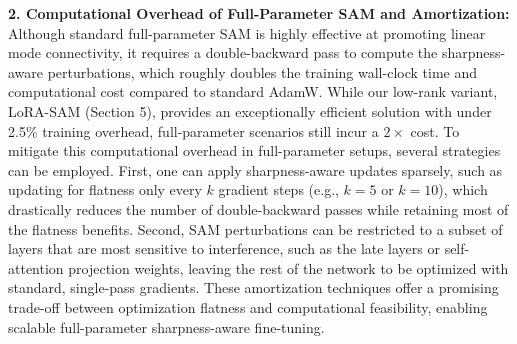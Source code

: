 \textbf{2. Computational Overhead of Full-Parameter SAM and Amortization:}
Although standard full-parameter SAM is highly effective at promoting linear mode connectivity,
it requires a double-backward pass to compute the sharpness-aware perturbations, which roughly
doubles the training wall-clock time and computational cost compared to standard AdamW. While our
low-rank variant, LoRA-SAM (Section 5), provides an exceptionally efficient solution with under
2.5\% training overhead, full-parameter scenarios still incur a $2\times$ cost. To mitigate this
computational overhead in full-parameter setups, several strategies can be employed. First, one
can apply sharpness-aware updates sparsely, such as updating for flatness only every $k$ gradient
steps (e.g., $k=5$ or $k=10$), which drastically reduces the number of double-backward passes while
retaining most of the flatness benefits. Second, SAM perturbations can be restricted to a subset of
layers that are most sensitive to interference, such as the late layers or self-attention projection
weights, leaving the rest of the network to be optimized with standard, single-pass gradients. These
amortization techniques offer a promising trade-off between optimization flatness and computational
feasibility, enabling scalable full-parameter sharpness-aware fine-tuning.

